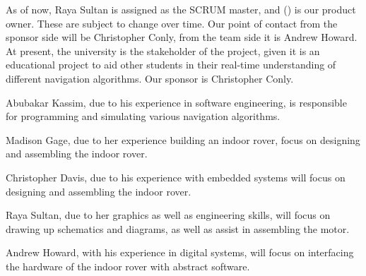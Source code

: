 
As of now, Raya Sultan is assigned as the SCRUM master, and () is our product owner. These are subject to change over time. Our point of contact from the sponsor side will be Christopher Conly, from the team side it is Andrew Howard. At present, the university is the stakeholder of the project, given it is an educational project to aid other students in their real-time understanding of different navigation algorithms. Our sponsor is Christopher Conly.

Abubakar Kassim, due to his experience in software engineering, is responsible for programming and simulating various navigation algorithms. 

Madison Gage, due to her experience building an indoor rover, focus on designing and assembling the indoor rover.

Christopher Davis, due to his experience with embedded systems will focus on designing and assembling the indoor rover.

Raya Sultan, due to her graphics as well as engineering skills, will focus on drawing up schematics and diagrams, as well as assist in assembling the motor.

Andrew Howard, with his experience in digital systems, will focus on interfacing the hardware of the indoor rover with abstract software.

